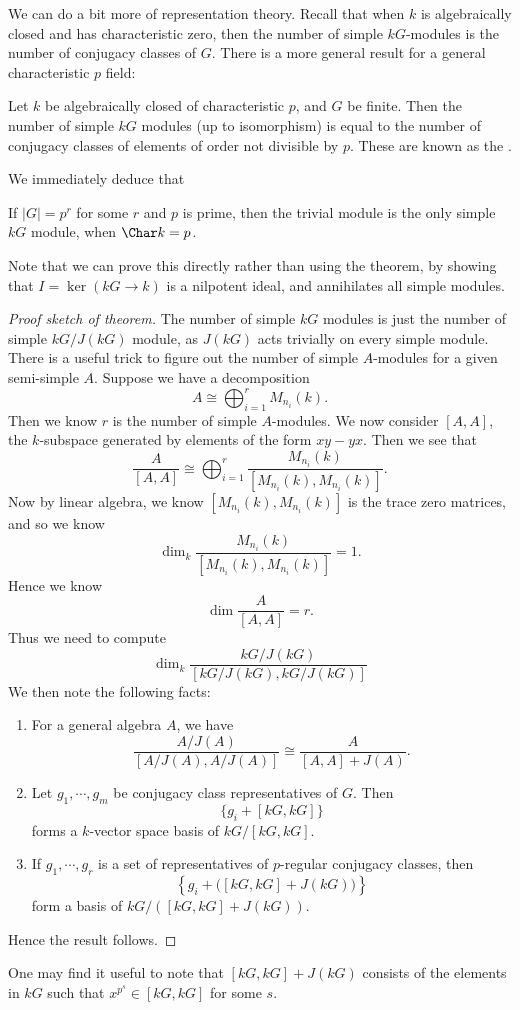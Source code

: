 \documentclass[a4paper]{article}
\begin{document}
We can do a bit more of representation theory. Recall that when $k$ is algebraically closed and has characteristic zero, then the number of simple $kG$-modules is the number of conjugacy classes of $G$. There is a more general result for a general characteristic $p$ field:
\begin{thm}
  Let $k$ be algebraically closed of characteristic $p$, and $G$ be finite. Then the number of simple $kG$ modules (up to isomorphism) is equal to the number of conjugacy classes of elements of order not divisible by $p$. These are known as the .
\end{thm}

We immediately deduce that
\begin{cor}
  If $|G| = p^r$ for some $r$ and $p$ is prime, then the trivial module is the only simple $kG$ module, when $\Char k = p$.
\end{cor}
Note that we can prove this directly rather than using the theorem, by showing that $I = \ker (kG \to k)$ is a nilpotent ideal, and annihilates all simple modules. %

\begin{proof}[Proof sketch of theorem]
  The number of simple $kG$ modules is just the number of simple $kG/J(kG)$ module, as $J(kG)$ acts trivially on every simple module. There is a useful trick to figure out the number of simple $A$-modules for a given semi-simple $A$. Suppose we have a decomposition
  \[
    A \cong \bigoplus_{i = 1}^r M_{n_i}(k).
  \]
  Then we know $r$ is the number of simple $A$-modules. We now consider $[A, A]$, the $k$-subspace generated by elements of the form $xy - yx$. Then we see that
  \[
    \frac{A}{[A, A]} \cong \bigoplus_{i = 1}^r \frac{M_{n_i}(k)}{[M_{n_i}(k), M_{n_i}(k)]}.
  \]
  Now by linear algebra, we know $[M_{n_i}(k), M_{n_i}(k)]$ is the trace zero matrices, and so we know
  \[
    \dim_k \frac{M_{n_i}(k)}{[M_{n_i}(k), M_{n_i}(k)]} = 1.
  \]
  Hence we know
  \[
    \dim \frac{A}{[A, A]} = r.
  \]
  Thus we need to compute
  \[
    \dim_k \frac{kG/J(kG)}{[kG/J(kG), kG/J(kG)]}
  \]
  We then note the following facts:
  \begin{enumerate}
    \item For a general algebra $A$, we have
      \[
        \frac{A/J(A)}{[A/J(A), A/J(A)]} \cong \frac{A}{[A, A] + J(A)}.
      \]
    \item Let $g_1, \cdots, g_m$ be conjugacy class representatives of $G$. Then
      \[
        \{g_i + [kG, kG]\}
      \]
      forms a $k$-vector space basis of $kG/[kG, kG]$. %
    \item If $g_1, \cdots, g_r$ is a set of representatives of $p$-regular conjugacy classes, then
      \[
        \left\{g_i + \Big([kG, kG] + J(kG)\Big)\right\}
      \]
      form a basis of $kG/([kG, kG] + J(kG))$. %
  \end{enumerate}
  Hence the result follows.
\end{proof}
One may find it useful to note that $[kG, kG] + J(kG)$ consists of the elements in $kG$ such that $x^{p^s} \in [kG, kG]$ for some $s$.
\end{document}
